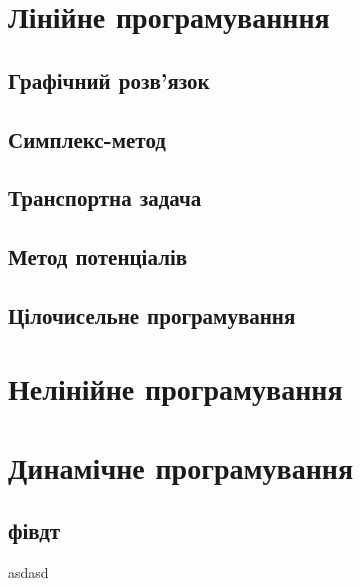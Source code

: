 \documentclass[a5paper,10pt]{book}
\begin{document}
\tableofcontents



\chapter{Лінійне програмуванння}

\section{Графічний розв'язок}

\section{Симплекс-метод}

\section{Транспортна задача}

\section{Метод потенціалів}

\section{Цілочисельне програмування}

\chapter{Нелінійне програмування}

\chapter{Динамічне програмування}

\section{фівдт}

asdasd
\end{document}
